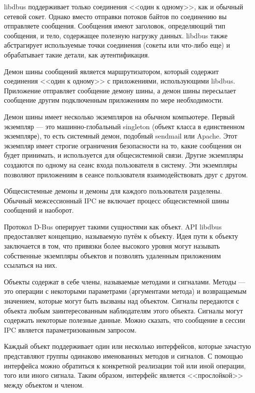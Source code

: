 \documentclass[bachelor, och, pract]{SCWorks}
\begin{document}
libdbus поддерживает только соединения <<один к одному>>, как и обычный сетевой сокет.
Однако вместо отправки потоков байтов по соединению вы отправляете сообщения.
Сообщения имеют заголовок, определяющий тип сообщения, и тело, содержащее полезную нагрузку данных.
libdbus также абстрагирует используемые точки соединения (сокеты или что-либо еще) и обрабатывает такие детали, как аутентификация.

Демон шины сообщений является маршрутизатором, который содержит соединения <<один к одному>> с приложениями, использующими libdbus.
Приложение отправляет сообщение демону шины, а демон шины пересылает сообщение другим подключенным приложениям по мере необходимости.

Демон шины имеет несколько экземпляров на обычном компьютере.
Первый экземпляр --- это машинно-глобальный singleton (объект класса в единственном экземпляре), то есть системный демон, подобный sendmail или Apache.
Этот экземпляр имеет строгие ограничения безопасности на то, какие сообщения он будет принимать, и используется для общесистемной связи.
Другие экземпляры создаются по одному на сеанс входа пользователя в систему.
Эти экземпляры позволяют приложениям в сеансе пользователя взаимодействовать друг с другом.

Общесистемные демоны и демоны для каждого пользователя разделены.
Обычный межсессионный IPC не включает процесс общесистемной шины сообщений и наоборот.

Протокол D-Bus оперирует такими сущностями как объект.
API libdbus предоставляет концепцию, называемую путём к объекту.
Идея пути к объекту заключается в том, что привязки более высокого уровня могут называть собственные экземпляры объектов и позволять удаленным приложениям ссылаться на них.

Объекты содержат в себе члены, называемые методами и сигналами.
Методы --- это операции с некоторыми параметрами (аргументами метода) и возвращаемым значением, которые могут быть вызваны над объектом.
Сигналы передаются с объекта любым заинтересованным наблюдателям этого объекта.
Сигналы могут содержать некоторые полезные данные. Можно сказать, что сообщение в сессии IPC является параметризованным запросом.

Каждый объект поддерживает один или несколько интерфейсов, которые зачастую представляют группы одинаково именованных методов и сигналов.
С помощью интерфейса можно обратиться к конкретной реализации той или иной операции, того или иного сигнала.
Таким образом, интерфейс является <<прослойкой>> между объектом и членом\cite{a_dbus}.
\end{document}
